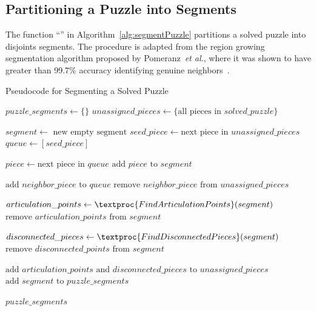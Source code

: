 \subsection{Partitioning a Puzzle into Segments}\label{sec:segmentPuzzle}

The function ``'' in Algorithm~\ref{alg:segmentPuzzle} partitions a solved puzzle into disjoints segments.  The procedure is adapted from the region growing segmentation algorithm proposed by Pomeranz~\textit{et al.}, where it was shown to have greater than 99.7\% accuracy identifying genuine neighbors~\cite{pomeranz2011}. 

\begin{algorithm}[tb]
\caption{Pseudocode for Segmenting a Solved Puzzle}\label{alg:segmentPuzzle}
\begin{algorithmic}[1]
    \State $puzzle\_segments \gets \{ \}$
    \State $unassigned\_pieces \gets \{ \text{all pieces in } solved\_puzzle \}$
\item[]
        \State $segment \gets \text{ new empty segment}$
        \State $seed\_piece \gets \text{next piece in } unassigned\_pieces$
        \State $queue \gets [seed\_piece]$
\item[]
            \State $piece \gets \text{next piece in } queue$
            \State $\text{add } piece \text{ to } segment$
\item[]
            		\State $\text{add } neighbor\_piece \text{ to } \textit{queue}$
            		\State $\text{remove } neighbor\_piece \text{ from } unassigned\_pieces$
            	\EndIf
            \EndFor
        \EndWhile
\item[]
        \State $articulation\_points \gets \textproc{FindArticulationPoints}(segment)$
        \State $\text{remove } articulation\_points \text{ from } \textit{segment}$
\item[]
		\State $disconnected\_pieces \gets \textproc{FindDisconnectedPieces}(segment)$ 
		\State $\text{remove } disconnected\_points \text{ from } segment$
\item[]
        \State $\text{add } \textit{articulation\_points} \text{ and } \textit{disconnected\_pieces} \text{ to } \textit{unassigned\_pieces}$               	
		\State $\text{add } segment \text{ to } puzzle\_segments$	
    \EndWhile
\item[]
    \State \Return $puzzle\_segments$
\EndFunction
\end{algorithmic}
\end{algorithm}

